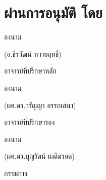 \section*{ผ่านการอนุมัติ โดย}
\vspace{20mm}
\noindent
\begin{minipage}{\dimexpr(\textwidth-\columnsep)/2\relax}
  \centering
  ลงนาม\ \dotfill\par
  (อ.ธีรวัฒน์ หวายฤทธิ์)\par
  อาจารย์ที่ปรึกษาหลัก
\end{minipage}
\par\vspace{25mm}
\noindent
\begin{minipage}{\dimexpr(\textwidth-\columnsep)/2\relax}
  \centering
  ลงนาม\ \dotfill\par
  (ผศ.ดร.วรัญญา อรรถเสนา)\par
  อาจารย์ที่ปรึกษารอง
\end{minipage}
\par\vspace{25mm}
\noindent
\begin{minipage}{\dimexpr(\textwidth-\columnsep)/2\relax}
  \centering
  ลงนาม\ \dotfill\par
  (ผศ.ดร.บุญรัตน์ เผดิมรอด)\par
  กรรมการ
\end{minipage}
